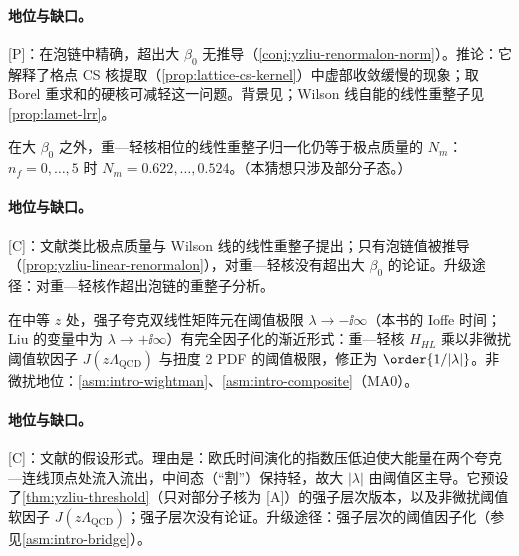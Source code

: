 \paragraph{地位与缺口。}[P]：在泡链中精确，超出大 $\beta_0$ 无推导（\cref{conj:yzliu-renormalon-norm}）。推论：它解释了格点 CS 核提取（\cref{prop:lattice-cs-kernel}）中虚部收敛缓慢的现象；取 Borel 重求和的硬核可减轻这一问题。背景见\cite{Beneke1999,Braun:2018brg}；Wilson 线自能的线性重整子见\cref{prop:lamet-lrr}。

\begin{conjecture}\label{conj:yzliu-renormalon-norm}
在大 $\beta_0$ 之外，重—轻核相位的线性重整子归一化仍等于极点质量的 $N_m$：$n_f=0,\dots,5$ 时 $N_m=0.622,\dots,0.524$\cite[式~(2.52)]{Liu:2023onm}。（本猜想只涉及部分子态。）
\end{conjecture}

\paragraph{地位与缺口。}[C]：文献\cite{Liu:2023onm}类比极点质量与 Wilson 线的线性重整子提出；只有泡链值被推导（\cref{prop:yzliu-linear-renormalon}），对重—轻核没有超出大 $\beta_0$ 的论证。升级途径：对重—轻核作超出泡链的重整子分析。

\begin{conjecture}\label{conj:yzliu-threshold-hadronic}
在中等 $z$ 处，强子夸克双线性矩阵元在阈值极限 $\lambda\to-\ii\infty$（本书的 Ioffe 时间；Liu 的变量中为 $\lambda\to+\ii\infty$）有完全因子化的渐近形式：重—轻核 $H_{HL}$ 乘以非微扰阈值软因子 $J(z\Lambda_{\mathrm{QCD}})$ 与扭度 2 PDF 的阈值极限，修正为 $\order{1/|\lambda|}$\cite[式~(3.50)]{Liu:2023onm}。非微扰地位：\cref{asm:intro-wightman}、\cref{asm:intro-composite}（MA0）。
\end{conjecture}

\paragraph{地位与缺口。}[C]：文献\cite{Liu:2023onm}的假设形式。理由是：欧氏时间演化的指数压低迫使大能量在两个夸克—连线顶点处流入流出，中间态（“割”）保持轻，故大 $|\lambda|$ 由阈值区主导。它预设了\cref{thm:yzliu-threshold}（只对部分子核为 [A]）的强子层次版本，以及非微扰阈值软因子 $J(z\Lambda_{\mathrm{QCD}})$；强子层次没有论证。升级途径：强子层次的阈值因子化（参见\cref{asm:intro-bridge}）。

